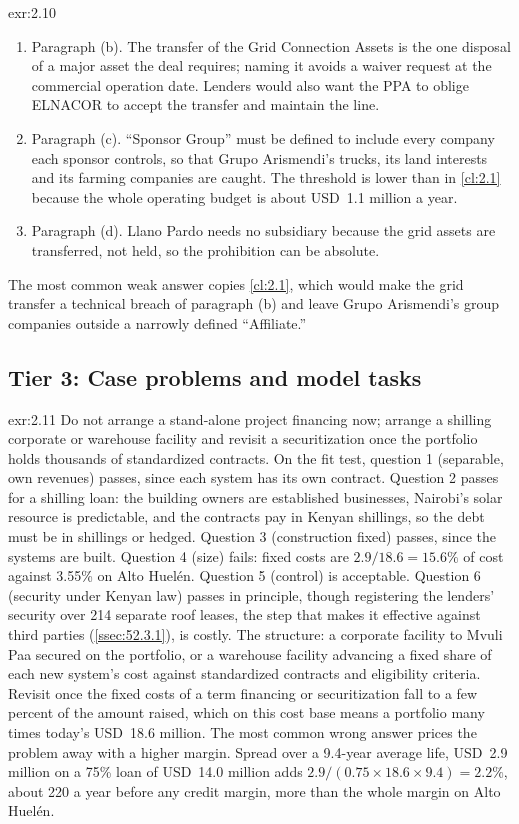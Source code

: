 \begin{solution}{exr:2.10}
\begin{enumerate}
\item Paragraph (b). The transfer of the Grid Connection Assets is the one disposal of a major asset the deal requires; naming it avoids a waiver request at the commercial operation date. Lenders would also want the PPA to oblige ELNACOR to accept the transfer and maintain the line.
\item Paragraph (c). ``Sponsor Group'' must be defined to include every company each sponsor controls, so that Grupo Arismendi's trucks, its land interests and its farming companies are caught. The threshold is lower than in \cref{cl:2.1} because the whole operating budget is about USD~1.1 million a year.
\item Paragraph (d). Llano Pardo needs no subsidiary because the grid assets are transferred, not held, so the prohibition can be absolute.
\end{enumerate}
The most common weak answer copies \cref{cl:2.1}, which would make the grid transfer a technical breach of paragraph (b) and leave Grupo Arismendi's group companies outside a narrowly defined ``Affiliate.''
\end{solution}

\subsection*{Tier 3: Case problems and model tasks}

\begin{solution}{exr:2.11}
Do not arrange a stand-alone project financing now; arrange a shilling corporate or warehouse facility and revisit a securitization once the portfolio holds thousands of standardized contracts. On the fit test, question 1 (separable, own revenues) passes, since each system has its own contract. Question 2 passes for a shilling loan: the building owners are established businesses, Nairobi's solar resource is predictable, and the contracts pay in Kenyan shillings, so the debt must be in shillings or hedged. Question 3 (construction fixed) passes, since the systems are built. Question 4 (size) fails: fixed costs are $2.9/18.6 = 15.6\%$ of cost against 3.55\% on Alto Huelén. Question 5 (control) is acceptable. Question 6 (security under Kenyan law) passes in principle, though registering the lenders' security over 214 separate roof leases, the step that makes it effective against third parties (\cref{ssec:52.3.1}), is costly. The structure: a corporate facility to Mvuli Paa secured on the portfolio, or a warehouse facility advancing a fixed share of each new system's cost against standardized contracts and eligibility criteria. Revisit once the fixed costs of a term financing or securitization fall to a few percent of the amount raised, which on this cost base means a portfolio many times today's USD~18.6 million. The most common wrong answer prices the problem away with a higher margin. Spread over a 9.4-year average life, USD~2.9 million on a 75\% loan of USD~14.0 million adds $2.9 / (0.75 \times 18.6 \times 9.4) = 2.2\%$, about 220\bps{} a year before any credit margin, more than the whole margin on Alto Huelén.
\end{solution}

